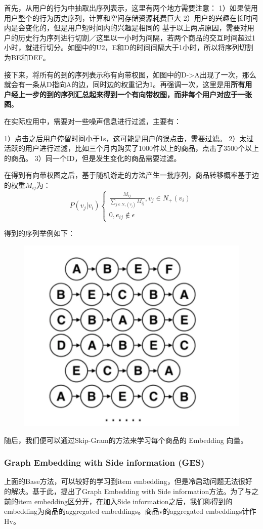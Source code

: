 \documentclass[12pt]{article}
\begin{document}
首先，从用户的行为中抽取出序列表示，这里有两个地方需要注意：
1）如果使用用户整个的行为历史序列，计算和空间存储资源耗费巨大
2）用户的兴趣在长时间内是会变化的，但是用户短时间内的兴趣是相同的
基于以上两点原因，需要对用户的历史行为序列进行切割／这里以一小时为间隔，若两个商品的交互时间超过1小时，就进行切分。如图中的U2，E和D的时间间隔大于1小时，所以将序列切割为BE和DEF。

接下来，将所有的到的序列表示称有向带权图，如图中的D->A出现了一次，那么就会有一条从D指向A的边，同时边的权重记为1。再强调一次，这里是用\textbf{所有用户经上一步的到的序列汇总起来得到一个有向带权图，而非每个用户对应于一张图}。

在实际应用中，需要对一些噪声信息进行过滤，主要有：

1）点击之后用户停留时间小于1s，这可能是用户的误点击，需要过滤。
2）太过活跃的用户进行过滤，比如三个月内购买了1000件以上的商品，点击了3500个以上的商品。
3）同一个ID，但是发生变化的商品需要过滤。

在得到有向带权图之后，基于随机游走的方法产生一批序列，商品转移概率基于边的权重$M_{ij}$为：
$$
P(v_j|v_i) \begin{cases}
\frac{M_{ij}}{\sum_{j \in N_{+}(v_j)} M_{ij}}, v_j \in N_{+}(v_i) \\
0, e_{ij} \notin \epsilon
\end{cases}
$$

得到的序列举例如下：
\begin{figure}[H]
    \centering
    \includegraphics[width=.4\textwidth]{fig/Graph_Embedding_BGE_Sequences.png}
\end{figure}

随后，我们便可以通过Skip-Gram的方法来学习每个商品的 Embedding 向量。

\subsubsection{Graph Embedding with Side information (GES)}
上面的Base方法，可以较好的学习到item embedding，但是冷启动问题无法很好的解决。基于此，提出了Graph Embedding with Side information方法。为了与之前的item embedding区分开，在加入Side information之后，我们称得到的embedding为商品的aggregated embeddings。商品v的aggregated embeddings计作Hv。
\end{document}
